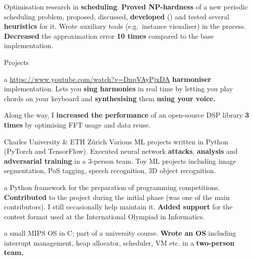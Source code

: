 %
%
\: Optimisation research in {\bf scheduling}.
\: {\bf Proved NP-hardness} of a new periodic scheduling problem, proposed, discussed, {\bf
developed} (\Cpp) and tested several {\bf heuristics} for it. Wrote auxiliary tools (e.g.~instance visualiser) in the process.
\:
{\bf Decreased} the approximation error {\bf 10 times} compared to the base implementation.

\endlist

\sekce Projects

%
a \Cpp{} \url{https://www.youtube.com/watch?v=DnpVAyPjxDA}{{\bf
harmoniser}} implementation.
\: Lets you {\bf sing harmonies} in real time by letting you play chords on
your keyboard and {\bf synthesising} them {\bf using your voice.}

\: Along the way, I {\bf increased the performance} of an
open-source DSP library {\bf 3 times} by optimising FFT usage and data reuse.

\endlist

 Charles University \& ETH Zürich
%
\: Various ML projects written in Python (PyTorch and TensorFlow).
\: Executed neural network {\bf attacks}, {\bf analysis} and {\bf adversarial training} in a 3-person team.
\: Toy ML projects including image segmentation, PoS tagging, speech recognition, 3D object recognition.
\endlist

 a Python framework for the preparation of programming competitions.
%
\: {\bf Contributed} to the project during the initial phase (was one of the main contributors). I still occasionally help maintain it.
\: {\bf Added support} for the contest format used at the International Olympiad in Informatics.
\endlist

 a small MIPS OS in C; part of a university course.
%
\: {\bf Wrote an OS} including interrupt management, heap allocator,
scheduler, VM etc. in a {\bf two-person team.}
\endlist



